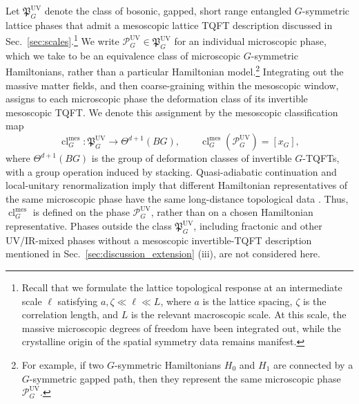\documentclass[aps,prx,reprint,superscriptaddress,twocolumn,amsmath,amssymb,amsfonts, nofootinbib]{revtex4-2}
\theoremstyle{apsstyle}
\begin{document}
Let $\mathfrak P_{G}^{\mathrm{UV}}$ denote the class of bosonic, gapped, short range entangled $G$-symmetric lattice phases that admit a mesoscopic lattice TQFT description discussed in Sec.~\ref{sec:scales}.\footnote{Recall that we formulate the lattice topological response at an intermediate scale $\ell$ satisfying $a,\zeta\ll \ell\ll L$, where $a$ is the lattice spacing, $\zeta$ is the correlation length, and $L$ is the relevant macroscopic scale. At this scale, the massive microscopic degrees of freedom have been integrated out, while the crystalline origin of the spatial symmetry data remains manifest.} 
We write $\mathcal P_G^{\mathrm{UV}}\in\mathfrak P_G^{\mathrm{UV}}$ for an individual microscopic phase, which we take to be an equivalence class of microscopic $G$-symmetric Hamiltonians, rather than a particular Hamiltonian model.\footnote{For example, if two $G$-symmetric Hamiltonians $H_0$ and $H_1$ are connected by a $G$-symmetric gapped path, then they represent the same microscopic phase $\mathcal P_G^{\mathrm{UV}}$.}
Integrating out the massive matter fields, and then coarse-graining within the mesoscopic window, assigns to each microscopic phase the deformation class of its invertible mesoscopic TQFT. We denote this assignment by the mesoscopic classification map
\begin{equation}
\operatorname{cl}^{\mathrm{mes}}_G: \mathfrak P_{G}^{\mathrm{UV}} \longrightarrow \Theta^{d+1}(BG), \qquad
\operatorname{cl}^{\mathrm{mes}}_G
(\mathcal P_G^{\mathrm{UV}}) =[x_G],
\label{eq:microscopic_to_mesoscopic_classification}
\end{equation}
where $\Theta^{d+1}(BG)$ is the group of deformation classes of invertible $G$-TQFTs, with a group operation induced by stacking. Quasi-adiabatic continuation and local-unitary renormalization imply that different Hamiltonian representatives of the same microscopic phase have the same long-distance topological data \cite{HastingsWen2005,ChenGuWen2010}. Thus, $\operatorname{cl}^{\mathrm{mes}}_G$ is defined on the phase $\mathcal P_G^{\mathrm{UV}}$, rather than on a chosen Hamiltonian representative. Phases outside the class $\mathfrak P_G^{\mathrm{UV}}$, including fractonic and other UV/IR-mixed phases without a mesoscopic invertible-TQFT description mentioned in Sec.~\ref{sec:discussion_extension} (iii), are not considered here. 

\medskip 
\end{document}
